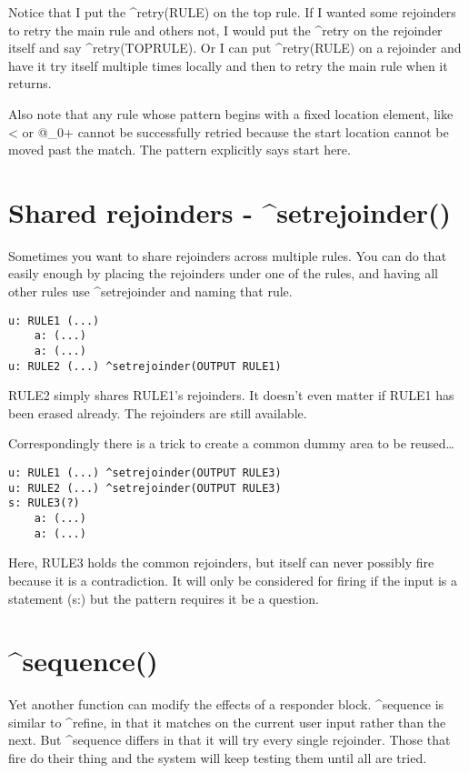 \documentclass[]{article}
\begin{document}
Notice that I put the \^{}retry(RULE) on the top rule. If I wanted some
rejoinders to retry the main rule and others not, I would put the
\^{}retry on the rejoinder itself and say \^{}retry(TOPRULE). Or I can
put \^{}retry(RULE) on a rejoinder and have it try itself multiple times
locally and then to retry the main rule when it returns.

Also note that any rule whose pattern begins with a fixed location
element, like \textless{} or @\_0+ cannot be successfully retried
because the start location cannot be moved past the match. The pattern
explicitly says start here.

\section{Shared rejoinders -
\^{}setrejoinder()}\label{shared-rejoinders---setrejoinder}

Sometimes you want to share rejoinders across multiple rules. You can do
that easily enough by placing the rejoinders under one of the rules, and
having all other rules use \^{}setrejoinder and naming that rule.

\begin{verbatim}
u: RULE1 (...) 
    a: (...) 
    a: (...)
u: RULE2 (...) ^setrejoinder(OUTPUT RULE1)
\end{verbatim}

RULE2 simply shares RULE1's rejoinders. It doesn't even matter if RULE1
has been erased already. The rejoinders are still available.

Correspondingly there is a trick to create a common dummy area to be
reused\ldots{}

\begin{verbatim}
u: RULE1 (...) ^setrejoinder(OUTPUT RULE3)
u: RULE2 (...) ^setrejoinder(OUTPUT RULE3)
s: RULE3(?) 
    a: (...) 
    a: (...)
\end{verbatim}

Here, RULE3 holds the common rejoinders, but itself can never possibly
fire because it is a contradiction. It will only be considered for
firing if the input is a statement (s:) but the pattern requires it be a
question.

\section{\^{}sequence()}\label{sequence}

Yet another function can modify the effects of a responder block.
\^{}sequence is similar to \^{}refine, in that it matches on the current
user input rather than the next. But \^{}sequence differs in that it
will try every single rejoinder. Those that fire do their thing and the
system will keep testing them until all are tried.
\end{document}
